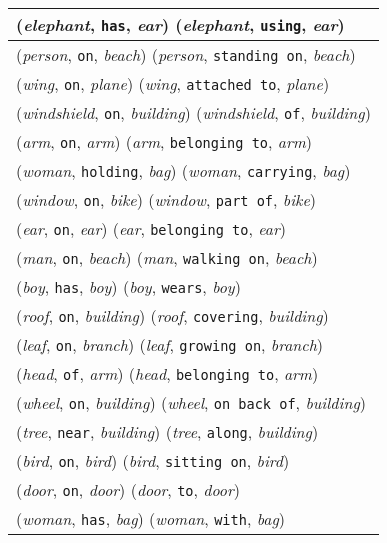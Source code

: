 \documentclass[runningheads]{llncs}
\begin{document}
{\begin{longtable}{ l }
(\textit{elephant}, \texttt{has}, \textit{ear})  (\textit{elephant}, \texttt{using}, \textit{ear}) \\ \hline
(\textit{person}, \texttt{on}, \textit{beach})  (\textit{person}, \texttt{standing on}, \textit{beach}) \\ \hline
(\textit{wing}, \texttt{on}, \textit{plane})  (\textit{wing}, \texttt{attached to}, \textit{plane}) \\ \hline
(\textit{windshield}, \texttt{on}, \textit{building})  (\textit{windshield}, \texttt{of}, \textit{building}) \\ \hline
(\textit{arm}, \texttt{on}, \textit{arm})  (\textit{arm}, \texttt{belonging to}, \textit{arm}) \\ \hline
(\textit{woman}, \texttt{holding}, \textit{bag})  (\textit{woman}, \texttt{carrying}, \textit{bag}) \\ \hline
(\textit{window}, \texttt{on}, \textit{bike})  (\textit{window}, \texttt{part of}, \textit{bike}) \\ \hline
(\textit{ear}, \texttt{on}, \textit{ear})  (\textit{ear}, \texttt{belonging to}, \textit{ear}) \\ \hline
(\textit{man}, \texttt{on}, \textit{beach})  (\textit{man}, \texttt{walking on}, \textit{beach}) \\ \hline
(\textit{boy}, \texttt{has}, \textit{boy})  (\textit{boy}, \texttt{wears}, \textit{boy}) \\ \hline
(\textit{roof}, \texttt{on}, \textit{building})  (\textit{roof}, \texttt{covering}, \textit{building}) \\ \hline
(\textit{leaf}, \texttt{on}, \textit{branch})  (\textit{leaf}, \texttt{growing on}, \textit{branch}) \\ \hline
(\textit{head}, \texttt{of}, \textit{arm})  (\textit{head}, \texttt{belonging to}, \textit{arm}) \\ \hline
(\textit{wheel}, \texttt{on}, \textit{building})  (\textit{wheel}, \texttt{on back of}, \textit{building}) \\ \hline
(\textit{tree}, \texttt{near}, \textit{building})  (\textit{tree}, \texttt{along}, \textit{building}) \\ \hline
(\textit{bird}, \texttt{on}, \textit{bird})  (\textit{bird}, \texttt{sitting on}, \textit{bird}) \\ \hline
(\textit{door}, \texttt{on}, \textit{door})  (\textit{door}, \texttt{to}, \textit{door}) \\ \hline
(\textit{woman}, \texttt{has}, \textit{bag})  (\textit{woman}, \texttt{with}, \textit{bag}) \\ \hline

\end{longtable}}
\end{document}
